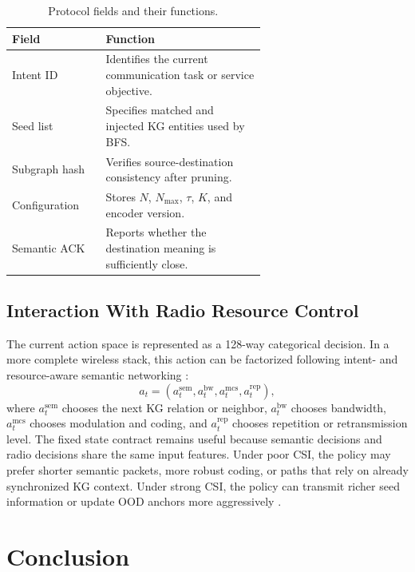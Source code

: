 \documentclass[journal]{IEEEtran}
\begin{document}
\begin{table}[!t]
\centering
\caption{Protocol fields and their functions.}
\label{tab:packet}
\begin{tabular}{l p{0.63\linewidth}}
\toprule
Field & Function\\
\midrule
Intent ID & Identifies the current communication task or service objective.\\
Seed list & Specifies matched and injected KG entities used by BFS.\\
Subgraph hash & Verifies source-destination consistency after pruning.\\
Configuration & Stores $N$, $N_{\max}$, $\tau$, $K$, and encoder version.\\
Semantic ACK & Reports whether the destination meaning is sufficiently close.\\
\bottomrule
\end{tabular}
\end{table}

\subsection{Interaction With Radio Resource Control}

The current action space is represented as a 128-way categorical decision. In a more complete wireless stack, this action can be factorized following intent- and resource-aware semantic networking \cite{qin2025genai,krayani2026aav}:
\begin{equation}
a_t=(a_t^{\mathrm{sem}},a_t^{\mathrm{bw}},a_t^{\mathrm{mcs}},a_t^{\mathrm{rep}}),
\end{equation}
where $a_t^{\mathrm{sem}}$ chooses the next KG relation or neighbor, $a_t^{\mathrm{bw}}$ chooses bandwidth, $a_t^{\mathrm{mcs}}$ chooses modulation and coding, and $a_t^{\mathrm{rep}}$ chooses repetition or retransmission level. The fixed state contract remains useful because semantic decisions and radio decisions share the same input features. Under poor CSI, the policy may prefer shorter semantic packets, more robust coding, or paths that rely on already synchronized KG context. Under strong CSI, the policy can transmit richer seed information or update OOD anchors more aggressively \cite{yang2025swinjscc,devoto2026token,li2023fast}.

\section{Conclusion}
\end{document}
